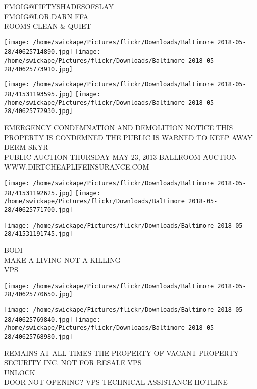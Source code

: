 \documentclass[10pt,letterpaper]{article}
\begin{document}
FMOIG@FIFTYSHADESOFSLAY\\
FMOIG@LOR.DARN FFA\\
ROOMS CLEAN \& QUIET\\
\pagebreak

\texttt{[image: /home/swickape/Pictures/flickr/Downloads/Baltimore 2018-05-28/40625714890.jpg]}
\texttt{[image: /home/swickape/Pictures/flickr/Downloads/Baltimore 2018-05-28/40625773910.jpg]}

\texttt{[image: /home/swickape/Pictures/flickr/Downloads/Baltimore 2018-05-28/41531193595.jpg]}
\texttt{[image: /home/swickape/Pictures/flickr/Downloads/Baltimore 2018-05-28/40625772930.jpg]}

EMERGENCY CONDEMNATION AND DEMOLITION NOTICE THIS PROPERTY IS CONDEMNED THE PUBLIC IS WARNED TO KEEP AWAY\\
DERM SKYR\\
PUBLIC AUCTION THURSDAY MAY 23, 2013 BALLROOM AUCTION\\
WWW.DIRTCHEAPLIFEINSURANCE.COM\\
\pagebreak

\texttt{[image: /home/swickape/Pictures/flickr/Downloads/Baltimore 2018-05-28/41531192625.jpg]}
\texttt{[image: /home/swickape/Pictures/flickr/Downloads/Baltimore 2018-05-28/40625771700.jpg]}

\texttt{[image: /home/swickape/Pictures/flickr/Downloads/Baltimore 2018-05-28/41531191745.jpg]}

BODI\\
MAKE A LIVING NOT A KILLING\\
VPS\\
\pagebreak

\texttt{[image: /home/swickape/Pictures/flickr/Downloads/Baltimore 2018-05-28/40625770650.jpg]}

\vspace{0.25in}
\texttt{[image: /home/swickape/Pictures/flickr/Downloads/Baltimore 2018-05-28/40625769840.jpg]}
\texttt{[image: /home/swickape/Pictures/flickr/Downloads/Baltimore 2018-05-28/40625768980.jpg]}

REMAINS AT ALL TIMES THE PROPERTY OF VACANT PROPERTY SECURITY INC. NOT FOR RESALE VPS\\
UNLOCK\\
DOOR NOT OPENING?  VPS TECHNICAL ASSISTANCE HOTLINE\\
\pagebreak
\end{document}
